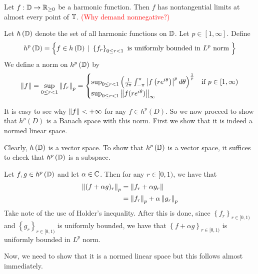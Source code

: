 \begin{corollary}
    Let $f: \mathbb D \to \mathbb R_{\ge 0}$ be a harmonic function. Then $f$ has nontangential limits at almost every point of $\mathbb T$. \textcolor{red}{(Why demand nonnegative?)}
    \label{cor:nontangential-limits}
\end{corollary}

Let $h \left( \mathbb D \right)$ denote the set of all harmonic functions on $\mathbb D$. Let $p\in [1,\infty]$. Define
\begin{equation*}
    h^{p} \left( \mathbb D \right) = \left\{ f\in h \left( \mathbb D \right) \, \mid \, \left\{ f_{r} \right\}_{0\le r < 1} \text{ is uniformly bounded in } L^{p} \text{ norm }\right\}
\end{equation*}
We define a norm on $h^{p} \left( \mathbb D \right)$ by
\begin{equation*}
    \left\lVert f \right\rVert = \sup_{0\le r < 1} \left\lVert f_{r} \right\rVert_{p} =\begin{cases} \sup_{0\le r < 1} \left( \frac{1}{2\pi} \int_{-\pi}^{\pi} \left\lvert f\left( re^{i\theta}\right) \right\rvert^{p}d\theta   \right)^{\frac{1}{p}} & \text{if } p \in [1, \infty) \\
	\sup_{0\le r < 1} \left\lVert f(re^{i\theta}) \right\rVert_{\infty}
    \end{cases}
\end{equation*}

It is easy to see why $\left\lVert f \right\rVert < +\infty$ for any $f\in h^{p} \left( D \right)$. So we now proceed to show that $h^{p} \left( D \right)$ is a Banach space with this norm. First we show that it is indeed a normed linear space.

Clearly, $h \left( \mathbb D \right)$ is a vector space. To show that $h^{p} \left( \mathbb D \right)$ is a vector space, it suffices to check that $h^{p} \left( \mathbb D \right)$ is a subspace.

Let $f,g \in h^{p} \left( \mathbb D \right)$ and let $\alpha \in \mathbb C$. Then for any $r\in [0,1)$, we have that 
\begin{align*}
    \left\lVert (f+\alpha g)_{r} \right\rVert_{p} &= \left\lVert f_{r} + \alpha g_{r} \right\rVert \\
    &= \left\lVert f_{r} \right\rVert_{p} + \alpha \left\lVert g_{r} \right\rVert_{p}
\end{align*}
Take note of the use of Holder's inequality. After this is done, since $\left\{ f_{r} \right\}_{r\in [0,1)}$ and $\left\{ g_{r} \right\}_{r\in [0,1)}$ is uniformly bounded, we have that $\left\{ f+ \alpha g \right\}_{r\in [0,1)}$ is uniformly bounded in $L^{p}$ norm.

Now, we need to show that it is a normed linear space but this follows almost immediately.

